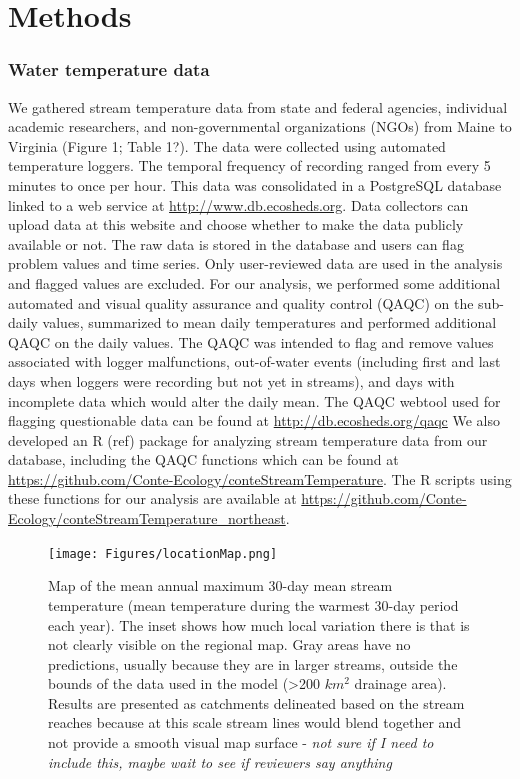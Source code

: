 \documentclass[]{article}
\begin{document}
\section{Methods}\label{methods}

\subsubsection{Water temperature data}\label{water-temperature-data}

We gathered stream temperature data from state and federal agencies,
individual academic researchers, and non-governmental organizations
(NGOs) from Maine to Virginia (Figure 1; Table 1?). The data were
collected using automated temperature loggers. The temporal frequency of
recording ranged from every 5 minutes to once per hour. This data was
consolidated in a PostgreSQL database linked to a web service at
\url{http://www.db.ecosheds.org}. Data collectors can upload data at
this website and choose whether to make the data publicly available or
not. The raw data is stored in the database and users can flag problem
values and time series. Only user-reviewed data are used in the analysis
and flagged values are excluded. For our analysis, we performed some
additional automated and visual quality assurance and quality control
(QAQC) on the sub-daily values, summarized to mean daily temperatures
and performed additional QAQC on the daily values. The QAQC was intended
to flag and remove values associated with logger malfunctions,
out-of-water events (including first and last days when loggers were
recording but not yet in streams), and days with incomplete data which
would alter the daily mean. The QAQC webtool used for flagging
questionable data can be found at \url{http://db.ecosheds.org/qaqc} We
also developed an R (ref) package for analyzing stream temperature data
from our database, including the QAQC functions which can be found at
\url{https://github.com/Conte-Ecology/conteStreamTemperature}. The R
scripts using these functions for our analysis are available at
\url{https://github.com/Conte-Ecology/conteStreamTemperature_northeast}.

\begin{figure}[htbp]
\centering
\texttt{[image: Figures/locationMap.png]}
\caption{Map of the mean annual maximum 30-day mean stream temperature
(mean temperature during the warmest 30-day period each year). The inset
shows how much local variation there is that is not clearly visible on
the regional map. Gray areas have no predictions, usually because they
are in larger streams, outside the bounds of the data used in the model
(\textgreater{}200 \(km^2\) drainage area). Results are presented as
catchments delineated based on the stream reaches because at this scale
stream lines would blend together and not provide a smooth visual map
surface - \emph{not sure if I need to include this, maybe wait to see if
reviewers say anything}}
\end{figure}
\end{document}
